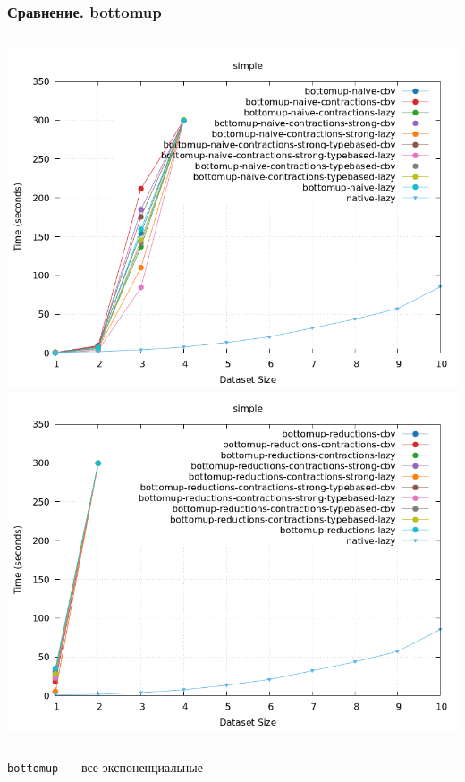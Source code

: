 \documentclass{beamer}
\begin{document}
\begin{frame}\frametitle{Сравнение. bottomup}
\begin{columns}
  \includegraphics[width=\textwidth]{bottomup.png}
  \includegraphics[width=\textwidth]{bottomup_reductions.png}
\end{columns}
\centering \texttt{bottomup}~--- все экспоненциальные
\end{frame}
\end{document}
